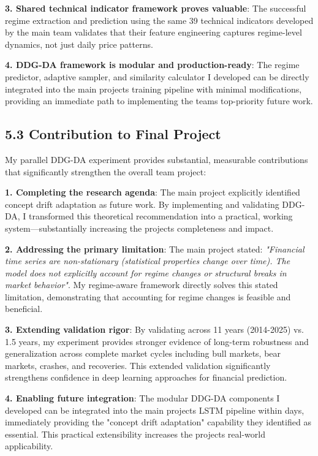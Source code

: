 \documentclass[
]{article}
\begin{document}
\textbf{3. Shared technical indicator framework proves valuable}: The
successful regime extraction and prediction using the same 39 technical
indicators developed by the main team validates that their feature
engineering captures regime-level dynamics, not just daily price
patterns.

\textbf{4. DDG-DA framework is modular and production-ready}: The regime
predictor, adaptive sampler, and similarity calculator I developed can
be directly integrated into the main project\textquotesingle s training
pipeline with minimal modifications, providing an immediate path to
implementing the team\textquotesingle s top-priority future work.

\subsection{5.3 Contribution to Final
Project}\label{53-contribution-to-final-project}

My parallel DDG-DA experiment provides substantial, measurable
contributions that significantly strengthen the overall team project:

\textbf{1. Completing the research agenda}: The main project explicitly
identified concept drift adaptation as future work. By implementing and
validating DDG-DA, I transformed this theoretical recommendation into a
practical, working system---substantially increasing the
project\textquotesingle s completeness and impact.

\textbf{2. Addressing the primary limitation}: The main project stated:
\emph{"Financial time series are non-stationary (statistical properties
change over time). The model does not explicitly account for regime
changes or structural breaks in market behavior"}. My regime-aware
framework directly solves this stated limitation, demonstrating that
accounting for regime changes is feasible and beneficial.

\textbf{3. Extending validation rigor}: By validating across 11 years
(2014-2025) vs. 1.5 years, my experiment provides stronger evidence of
long-term robustness and generalization across complete market cycles
including bull markets, bear markets, crashes, and recoveries. This
extended validation significantly strengthens confidence in deep
learning approaches for financial prediction.

\textbf{4. Enabling future integration}: The modular DDG-DA components I
developed can be integrated into the main project\textquotesingle s LSTM
pipeline within days, immediately providing the "concept drift
adaptation" capability they identified as essential. This practical
extensibility increases the project\textquotesingle s real-world
applicability.
\end{document}

